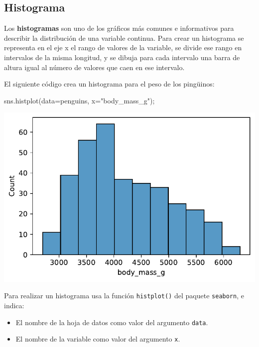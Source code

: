 \documentclass[
  a4paper,
  noprof,
  12pt,
  notoc,
  nosols,
  nobib]{mnye}
\newenvironment{Shaded}{\begin{snugshade}}{\end{snugshade}}
\newcommand{\NormalTok}[1]{\textcolor[rgb]{0.00,0.23,0.31}{#1}}
\newcommand{\OperatorTok}[1]{\textcolor[rgb]{0.37,0.37,0.37}{#1}}
\newcommand{\StringTok}[1]{\textcolor[rgb]{0.13,0.47,0.30}{#1}}
\providecommand{\tightlist}{%
  \setlength{\itemsep}{0pt}\setlength{\parskip}{0pt}}\usepackage{longtable,booktabs,array}
\theoremstyle{definition}
\theoremstyle{remark}
\begin{document}
\subsection{Histograma}\label{sec-1numerical-histogram}

Los \textbf{histogramas} son uno de los gráficos más comunes e
informativos para describir la distribución de una variable continua.
Para crear un histograma se representa en el eje x el rango de valores
de la variable, se divide ese rango en intervalos de la misma longitud,
y se dibuja para cada intervalo una barra de altura igual al número de
valores que caen en ese intervalo.

El siguiente código crea un histograma para el peso de los pingüinos:

\begin{Shaded}
\begin{Highlighting}[]
\NormalTok{sns.histplot(data}\OperatorTok{=}\NormalTok{penguins, x}\OperatorTok{=}\StringTok{"body\_mass\_g"}\NormalTok{)}\OperatorTok{;}
\end{Highlighting}
\end{Shaded}

\includegraphics{chapters/1numerical_files/figure-pdf/cell-5-output-1.pdf}

\begin{tcolorbox}[enhanced jigsaw, opacityback=0, leftrule=.75mm, left=2mm, arc=.35mm, rightrule=.15mm, colframe=quarto-callout-note-color-frame, bottomrule=.15mm, colback=white, breakable, toprule=.15mm]
\begin{minipage}[t]{5.5mm}
\textcolor{quarto-callout-note-color}{\faInfo}
\end{minipage}%
\begin{minipage}[t]{\textwidth - 5.5mm}

Para realizar un histograma usa la función \texttt{histplot()} del
paquete \texttt{seaborn}, e indica:

\begin{itemize}
\tightlist
\item
  El nombre de la hoja de datos como valor del argumento \texttt{data}.
\item
  El nombre de la variable como valor del argumento \texttt{x}.
\end{itemize}

\end{minipage}%
\end{tcolorbox}
\end{document}
